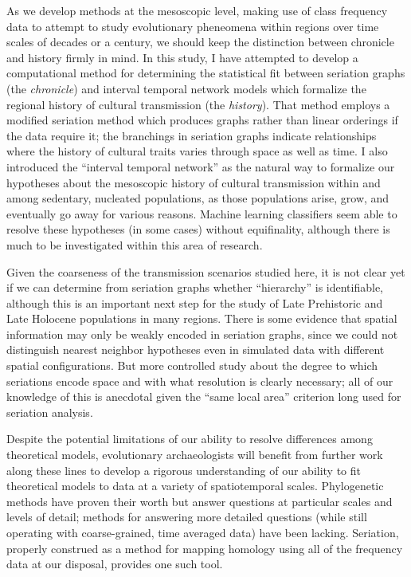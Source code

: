     As we develop methods at the mesoscopic level, making use of class frequency data to attempt to study evolutionary pheneomena within regions over time scales of decades or a century, we should keep the distinction between chronicle and history firmly in mind.  In this study, I have attempted to develop a computational method for determining the statistical fit between seriation graphs (the \emph{chronicle}) and interval temporal network models which formalize the regional history of cultural transmission (the \emph{history}).  That method employs a modified seriation method which produces graphs rather than linear orderings if the data require it; the branchings in seriation graphs indicate relationships where the history of cultural traits varies through space as well as time.  I also introduced the ``interval temporal network'' as the natural way to formalize our hypotheses about the mesoscopic history of cultural transmission within and among sedentary, nucleated populations, as those populations arise, grow, and eventually go away for various reasons.  Machine learning classifiers seem able to resolve these hypotheses (in some cases) without equifinality, although there is much to be investigated within this area of research.  
    
    Given the coarseness of the transmission scenarios studied here, it is not clear yet if we can determine from seriation graphs whether ``hierarchy'' is identifiable, although this is an important next step for the study of Late Prehistoric and Late Holocene populations in many regions.  There is some evidence that spatial information may only be weakly encoded in seriation graphs, since we could not distinguish nearest neighbor hypotheses even in simulated data with different spatial configurations.  But more controlled study about the degree to which seriations encode space and with what resolution is clearly necessary; all of our knowledge of this is anecdotal given the ``same local area'' criterion long used for seriation analysis.  
    
    Despite the potential limitations of our ability to resolve differences among theoretical models, evolutionary archaeologists will benefit from further work along these lines to develop a rigorous understanding of our ability to fit theoretical models to data at a variety of spatiotemporal scales.  Phylogenetic methods have proven their worth but answer questions at particular scales and levels of detail; methods for answering more detailed questions (while still operating with coarse-grained, time averaged data) have been lacking.  Seriation, properly construed as a method for mapping homology using all of the frequency data at our disposal, provides one such tool.  
    
    

